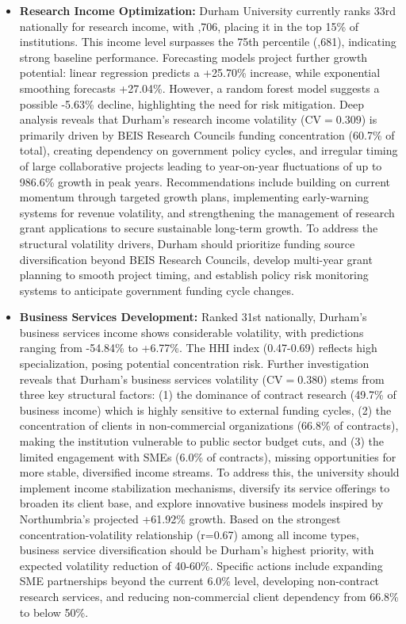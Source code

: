 \documentclass[journal,onecolumn, 10pt,draftclsnofoot]{IEEEtran}
\begin{document}
\begin{itemize}
    \item \textbf{Research Income Optimization:} Durham University currently ranks 33rd nationally for research income, with ,706, placing it in the top 15\% of institutions. This income level surpasses the 75th percentile (,681), indicating strong baseline performance. Forecasting models project further growth potential: linear regression predicts a +25.70\% increase, while exponential smoothing forecasts +27.04\%. However, a random forest model suggests a possible -5.63\% decline, highlighting the need for risk mitigation. Deep analysis reveals that Durham's research income volatility ($\mathrm{CV}=0.309$) is primarily driven by BEIS Research Councils funding concentration (60.7\% of total), creating dependency on government policy cycles, and irregular timing of large collaborative projects leading to year-on-year fluctuations of up to 986.6\% growth in peak years. Recommendations include building on current momentum through targeted growth plans, implementing early-warning systems for revenue volatility, and strengthening the management of research grant applications to secure sustainable long-term growth. To address the structural volatility drivers, Durham should prioritize funding source diversification beyond BEIS Research Councils, develop multi-year grant planning to smooth project timing, and establish policy risk monitoring systems to anticipate government funding cycle changes.
    
    \item \textbf{Business Services Development:} Ranked 31st nationally, Durham's business services income shows considerable volatility, with predictions ranging from -54.84\% to +6.77\%. The HHI index (0.47-0.69) reflects high specialization, posing potential concentration risk. Further investigation reveals that Durham's business services volatility ($\mathrm{CV}=0.380$) stems from three key structural factors: (1) the dominance of contract research (49.7\% of business income) which is highly sensitive to external funding cycles, (2) the concentration of clients in non-commercial organizations (66.8\% of contracts), making the institution vulnerable to public sector budget cuts, and (3) the limited engagement with SMEs (6.0\% of contracts), missing opportunities for more stable, diversified income streams. To address this, the university should implement income stabilization mechanisms, diversify its service offerings to broaden its client base, and explore innovative business models inspired by Northumbria's projected +61.92\% growth. Based on the strongest concentration-volatility relationship (r=0.67) among all income types, business service diversification should be Durham's highest priority, with expected volatility reduction of 40-60\%. Specific actions include expanding SME partnerships beyond the current 6.0\% level, developing non-contract research services, and reducing non-commercial client dependency from 66.8\% to below 50\%.
    

\end{itemize}
\end{document}
